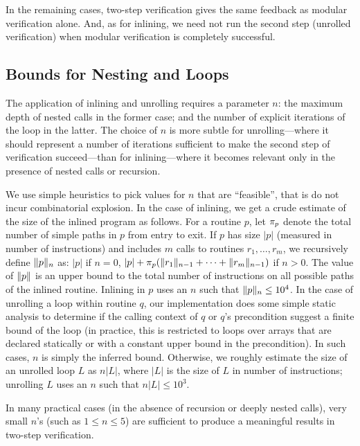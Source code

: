 In the remaining cases, two-step verification gives the same feedback as modular verification alone.
And, as for inlining, we need not run the second step (unrolled verification) when modular verification is completely successful.



\subsection{Bounds for Nesting and Loops} \label{sec:bounds}

The application of inlining and unrolling requires a parameter $n$: the maximum depth of nested calls in the former case; and the number of explicit iterations of the loop in the latter.
The choice of $n$ is more subtle for unrolling---where it should represent a number of iterations sufficient to make the second step of verification succeed---than for inlining---where it becomes relevant only in the presence of nested calls or recursion.

We use simple heuristics to pick values for $n$ that are ``feasible'', that is do not incur combinatorial explosion.
In the case of inlining, we get a crude estimate of the size of the inlined program as follows.
For a routine $p$, let $\pi_p$ denote the total number of simple paths in $p$ from entry to exit.
If $p$ has size $|p|$ (measured in number of instructions) and includes $m$ calls to routines $r_1, \ldots, r_m$, we recursively define $\Vert p\Vert_n$ as: $|p|$ if $n = 0$,  $|p| + \pi_p (\Vert r_1\Vert_{n-1} + \cdots + \Vert r_m\Vert_{n-1})$ if $n > 0$.
The value of $\Vert p\Vert$ is an upper bound to the total number of instructions on all possible paths of the inlined routine.
Inlining in $p$ uses an $n$ such that $\Vert p\Vert_n \leq 10^4$.
In the case of unrolling a loop within routine $q$, our implementation does some simple static analysis to determine if the calling context of $q$ or $q$'s precondition suggest a finite bound of the loop (in practice, this is restricted to loops over arrays that are declared statically or with a constant upper bound in the precondition).
In such cases, $n$ is simply the inferred bound.
Otherwise, we roughly estimate the size of an unrolled loop $L$ as $n|L|$, where $|L|$ is the size of $L$ in number of instructions; unrolling $L$ uses an $n$ such that $n|L| \leq 10^3$.

In many practical cases (in the absence of recursion or deeply nested calls), very small $n$'s (such as $1 \leq n \leq 5$) are sufficient to produce a meaningful results in two-step verification.




